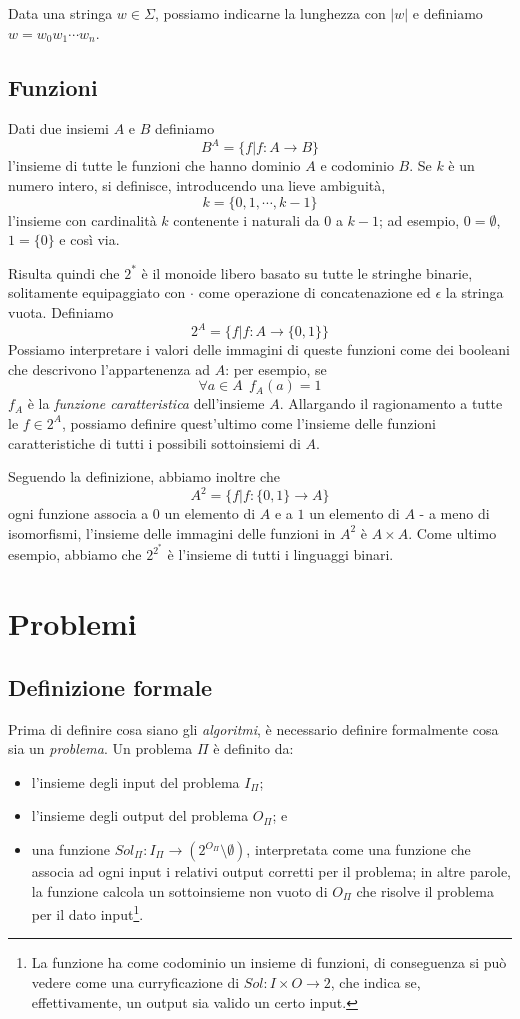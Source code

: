 Data una stringa $w \in \Sigma$, possiamo indicarne la lunghezza con $|w|$ e
definiamo $w = w_0 w_1\cdots w_n$.

\subsection{Funzioni}
Dati due insiemi $A$ e $B$ definiamo
$$
	B^A = \{f | f: A \rightarrow B\}
$$
l'insieme di tutte le funzioni che hanno dominio $A$ e codominio $B$.
Se $k$ è un numero intero, si definisce, introducendo una lieve ambiguità,
$$
	k = \{0,1,\cdots,k-1\}
$$
l'insieme con cardinalità $k$ contenente i naturali da $0$ a $k-1$;
ad esempio, $0 = \emptyset$, $1 = \{0\}$ e così via.

Risulta quindi che $2^*$ è il monoide libero basato su tutte le stringhe
binarie, solitamente equipaggiato con $\cdot$ come operazione di concatenazione
ed $\epsilon$ la stringa vuota. Definiamo
$$
	2^A = \{f | f: A \rightarrow \{0,1\}\}
$$
Possiamo interpretare i valori delle immagini di queste funzioni come dei booleani
che descrivono l'appartenenza ad $A$: per esempio, se
$$
	\forall a \in A ~~ f_A (a) = 1
$$
$f_A$ è la \textit{funzione caratteristica} dell'insieme $A$. Allargando il
ragionamento a tutte le $f \in 2^A$, possiamo definire quest'ultimo come l'insieme
delle funzioni caratteristiche di tutti i possibili sottoinsiemi di $A$.

Seguendo la definizione, abbiamo inoltre che
$$
	A^2 = \{f| f: \{0,1\} \rightarrow A\}
$$
ogni funzione associa a $0$ un elemento di $A$ e a $1$ un elemento di $A$ - a meno di isomorfismi,
l'insieme delle immagini delle funzioni in $A^2$ è $A \times A$.
Come ultimo esempio, abbiamo che $2^{2^*}$ è l'insieme di tutti i linguaggi
binari.

\section{Problemi}
\subsection{Definizione formale}
Prima di definire cosa siano gli \textit{algoritmi}, è necessario definire
formalmente cosa sia un \textit{problema}. Un problema $\Pi$ è definito da:
\begin{itemize}
	\setlength\itemsep{0pt}
	\item l'insieme degli input del problema $I_{\Pi}$;
	\item l'insieme degli output del problema $O_{\Pi}$; e
	\item una funzione $Sol_{\Pi}: I_{\Pi} \rightarrow (2^{O_{\Pi}} \setminus \emptyset)$,
	      interpretata come una funzione che associa ad ogni input i relativi
	      output corretti per il problema; in altre parole, la funzione calcola
	      un sottoinsieme non vuoto di $O_{\Pi}$ che risolve il problema per il dato input\footnote{
		      La funzione ha come codominio un insieme di funzioni, di conseguenza
		      si può vedere come una curryficazione di $Sol: I \times O \rightarrow 2$, che indica se,
		      effettivamente, un output sia valido un certo input.}.

\end{itemize}

